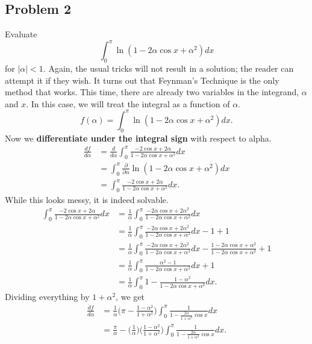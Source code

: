 \documentclass{article}
\begin{document}
\subsection*{Problem 2}
Evaluate $$\int_{0}^{\pi} \ln(1-2\alpha\cos{x}+\alpha^2)dx$$ for $|\alpha|<1$.
\newline Again, the usual tricks will not result in a solution; the reader can attempt it if they wish. It turns out that Feynman's Technique is the only method that works.
\newline This time, there are already two variables in the integrand, $\alpha$ and $x$. In this case, we will treat the integral as a function of $\alpha$.
$$f(\alpha)=\int_{0}^{\pi}\ln(1-2\alpha\cos{x}+\alpha^2)dx.$$
\newline Now we \textbf{differentiate under the integral sign} with respect to alpha.
\begin{equation*}
    \begin{split}
        \frac{df}{d\alpha} &=  \frac{d}{d\alpha}\int_{0}^{\pi}\frac{-2\cos{x}+2\alpha}{1-2\alpha\cos{x}+\alpha^2}dx \\ 
        &= \int_{0}^{\pi}\frac{\partial}{\partial \alpha}\ln(1-2\alpha\cos{x}+\alpha^2)dx \\
        &= \int_{0}^{\pi}\frac{-2\cos{x}+2\alpha}{1-2\alpha\cos{x}+\alpha^2}dx.
    \end{split}
\end{equation*}
While this looks messy, it is indeed solvable.
\begin{equation*}
    \begin{split}
        \int_{0}^{\pi}\frac{-2\cos{x}+2\alpha}{1-2\alpha\cos{x}+\alpha^2}dx &= \frac{1}{\alpha}\int_{0}^{\pi}\frac{-2\alpha\cos{x}+2\alpha^2}{1-2\alpha\cos{x}+\alpha^2}dx \\&= \frac{1}{\alpha}\int_{0}^{\pi}\frac{-2\alpha\cos{x}+2\alpha^2}{1-2\alpha\cos{x}+\alpha^2}dx - 1 + 1
        \\&=\frac{1}{\alpha}\int_{0}^{\pi}\frac{-2\alpha\cos{x}+2\alpha^2}{1-2\alpha\cos{x}+\alpha^2}dx - \frac{1-2\alpha\cos{x}+\alpha^2}{1-2\alpha\cos{x}+\alpha^2} + 1
        \\&=\frac{1}{\alpha}\int_{0}^{\pi}\frac{\alpha^2-1}{1-2\alpha\cos{x}+\alpha^2}dx + 1 \\&= \frac{1}{\alpha}\int_{0}^{\pi}1 - \frac{1-\alpha^2}{1-2\alpha\cos{x}+\alpha^2}dx.
    \end{split}
\end{equation*}
Dividing everything by $1+\alpha^2$, we get
\begin{equation}
    \begin{split}
        \frac{df}{d\alpha} &= \frac{1}{\alpha}\bigg(\pi-\frac{1-\alpha^2}{1+\alpha^2}\bigg)\int_{0}^{\pi}\frac{1}{1-\frac{2\alpha}{1+\alpha^2}\cos{x}}dx \\&= \frac{\pi}{\alpha}-\bigg(\frac{1}{\alpha}\bigg)\bigg(\frac{1-\alpha^2}{1+\alpha^2}\bigg)\int_{0}^{\pi}\frac{1}{1-\frac{2\alpha}{1+\alpha^2}\cos{x}}dx.
    \end{split}
\end{equation}
\end{document}
